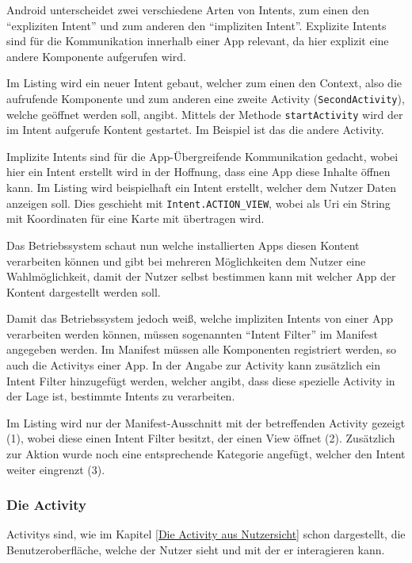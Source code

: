 Android unterscheidet zwei verschiedene Arten von Intents, zum einen den "`expliziten Intent"' und zum anderen den "`impliziten Intent"'. Explizite Intents sind f\"ur die Kommunikation innerhalb einer App relevant, da hier explizit eine andere Komponente aufgerufen wird. 

Im Listing wird ein neuer Intent gebaut, welcher zum einen den Context, also die aufrufende Komponente und zum anderen eine zweite Activity (\texttt{SecondActivity}), welche ge\"offnet werden soll, angibt. Mittels der Methode \texttt{startActivity} wird der im Intent aufgerufe Kontent gestartet. Im Beispiel ist das die andere Activity.



Implizite Intents sind f\"ur die App-\"Ubergreifende Kommunikation gedacht, wobei hier ein Intent erstellt wird in der Hoffnung, dass eine App diese Inhalte \"offnen kann.
Im Listing wird beispielhaft ein Intent erstellt, welcher dem Nutzer Daten anzeigen soll. Dies geschieht mit \texttt{Intent.ACTION\_VIEW}, wobei als Uri ein String mit Koordinaten f\"ur eine Karte mit \"ubertragen wird.



Das Betriebssystem schaut nun welche installierten Apps diesen Kontent verarbeiten k\"onnen und gibt bei mehreren M\"oglichkeiten dem Nutzer eine Wahlm\"oglichkeit, damit der Nutzer selbst bestimmen kann mit welcher App der Kontent dargestellt werden soll.

Damit das Betriebssystem jedoch wei\ss{}, welche impliziten Intents von einer App verarbeiten werden k\"onnen, m\"ussen sogenannten "`Intent Filter"' im Manifest angegeben werden.
Im Manifest m\"ussen alle Komponenten registriert werden, so auch die Activitys einer App. In der Angabe zur Activity kann zus\"atzlich ein Intent Filter hinzugef\"ugt werden, welcher angibt, dass diese spezielle Activity in der Lage ist, bestimmte Intents zu verarbeiten.

Im Listing wird nur der Manifest-Ausschnitt mit der betreffenden Activity gezeigt (1), wobei diese einen Intent Filter besitzt, der einen View \"offnet (2). Zus\"atzlich zur Aktion wurde noch eine entsprechende Kategorie angef\"ugt, welcher den Intent weiter eingrenzt (3). \cite{VogellaIntent}



\subsubsection{Die Activity} \label{Die Activity aus Programmierersicht}
Activitys sind, wie im Kapitel \ref{Die Activity aus Nutzersicht} schon dargestellt, die Benutzeroberfl\"ache, welche der Nutzer sieht und mit der er interagieren kann.

